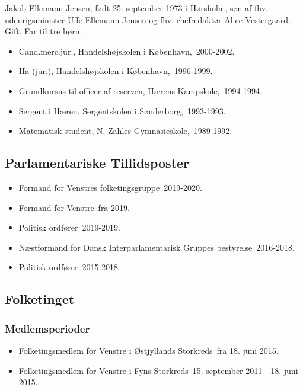 \documentclass[11pt, a4paper]{awesome-cv}
\begin{document}
\makecvheader[R]
\makelettertitle
\begin{cvletter}
Jakob Ellemann-Jensen, født 25. september 1973 i Hørsholm, søn af fhv. udenrigsminister Uffe Ellemann-Jensen og fhv. chefredaktør Alice Vestergaard. Gift. Far til tre børn.

\begin{itemize}
\item Cand.merc.jur., Handelshøjskolen i København, 2000-2002.
\item Ha (jur.), Handelshøjskolen i København, 1996-1999.
\item Grundkursus til officer af reserven, Hærens Kampskole, 1994-1994.
\item Sergent i Hæren, Sergentskolen i Sønderborg, 1993-1993.
\item Matematisk student, N. Zahles Gymnasieskole, 1989-1992.
\end{itemize}
\subsection*{Parlamentariske Tillidsposter}
\begin{itemize}
\item Formand for Venstres folketingsgruppe 2019-2020.
\item Formand for Venstre fra 2019.
\item Politisk ordfører 2019-2019.
\item Næstformand for Dansk Interparlamentarisk Gruppes bestyrelse 2016-2018.
\item Politisk ordfører 2015-2018.
\end{itemize}
\subsection*{Folketinget}
\subsubsection*{Medlemsperioder}
\begin{itemize}
\item Folketingsmedlem for Venstre i Østjyllands Storkreds fra 18. juni 2015.
\item Folketingsmedlem for Venstre i Fyns Storkreds 15. september 2011 - 18. juni 2015.
\end{itemize}

\end{cvletter}
\end{document}
